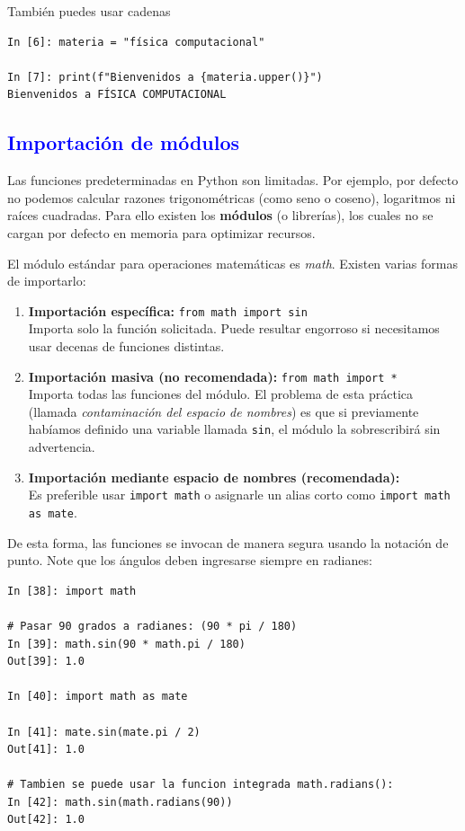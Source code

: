 \documentclass[12pt]{article}
\begin{document}
También puedes usar cadenas

\begin{lstlisting}
In [6]: materia = "física computacional"

In [7]: print(f"Bienvenidos a {materia.upper()}")
Bienvenidos a FÍSICA COMPUTACIONAL
\end{lstlisting}

\subsection*{\textcolor{blue}{Importación de módulos}}

Las funciones predeterminadas en Python son limitadas. Por ejemplo, por defecto no podemos 
calcular razones trigonométricas (como seno o coseno), logaritmos ni raíces cuadradas. 
Para ello existen los \textbf{módulos} (o librerías), los cuales no se cargan por defecto en 
memoria para optimizar recursos.

El módulo estándar para operaciones matemáticas es \textit{math}. Existen varias formas de importarlo:

\begin{enumerate}
    \item \textbf{Importación específica:} \lstinline|from math import sin| \\
    Importa solo la función solicitada. Puede resultar engorroso si necesitamos usar decenas 
    de funciones distintas.

    \item \textbf{Importación masiva (no recomendada):} \lstinline|from math import *| \\
    Importa todas las funciones del módulo. El problema de esta práctica 
    (llamada \textit{contaminación del espacio de nombres}) es que si previamente habíamos 
    definido una variable llamada \texttt{sin}, el módulo la sobrescribirá sin advertencia.

    \item \textbf{Importación mediante espacio de nombres (recomendada):} \\
    Es preferible usar \lstinline|import math| o asignarle un alias corto como 
    \lstinline|import math as mate|.
\end{enumerate}

De esta forma, las funciones se invocan de manera segura usando la notación de punto. 
Note que los ángulos deben ingresarse siempre en radianes:

\begin{lstlisting}
In [38]: import math

# Pasar 90 grados a radianes: (90 * pi / 180)
In [39]: math.sin(90 * math.pi / 180)
Out[39]: 1.0

In [40]: import math as mate

In [41]: mate.sin(mate.pi / 2)
Out[41]: 1.0

# Tambien se puede usar la funcion integrada math.radians():
In [42]: math.sin(math.radians(90))
Out[42]: 1.0
\end{lstlisting}
\end{document}
